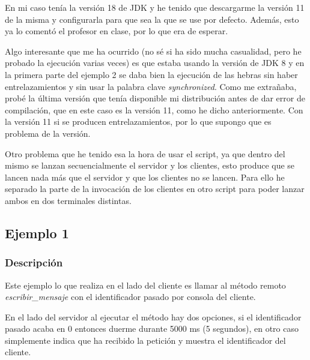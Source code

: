 \documentclass{article}
\begin{document}
En mi caso tenía la versión 18 de JDK y he tenido que descargarme la versión 11 de la misma y configurarla para que sea la que se use por defecto. Además, esto ya lo comentó el profesor en clase, por lo que era de esperar.

\bigskip

Algo interesante que me ha ocurrido (no sé si ha sido mucha casualidad, pero he probado la ejecución varias veces) es que estaba usando la versión de JDK 8 y en la primera parte del ejemplo 2 se daba bien la ejecución de las hebras sin haber entrelazamientos y sin usar la palabra clave \textit{synchronized}. Como me extrañaba, probé la última versión que tenía disponible mi distribución antes de dar error de compilación, que en este caso es la versión 11, como he dicho anteriormente. Con la versión 11 si se producen entrelazamientos, por lo que supongo que es problema de la versión.

\bigskip
Otro problema que he tenido esa la hora de usar el script, ya que dentro del mismo se lanzan secuencialmente el servidor y los clientes, esto produce que se lancen nada más que el servidor y que los clientes no se lancen. Para ello he separado la parte de la invocación de los clientes en otro script para poder lanzar ambos en dos terminales distintas.

\subsection{Ejemplo 1}
\subsubsection{Descripción}
Este ejemplo lo que realiza en el lado del cliente es llamar al método remoto \textit{escribir\_mensaje} con el identificador pasado por consola del cliente.

\bigskip

En el lado del servidor al ejecutar el método hay dos opciones, si el identificador pasado acaba en 0 entonces duerme durante 5000 ms (5 segundos), en otro caso simplemente indica que ha recibido la petición y muestra el identificador del cliente.
\end{document}
